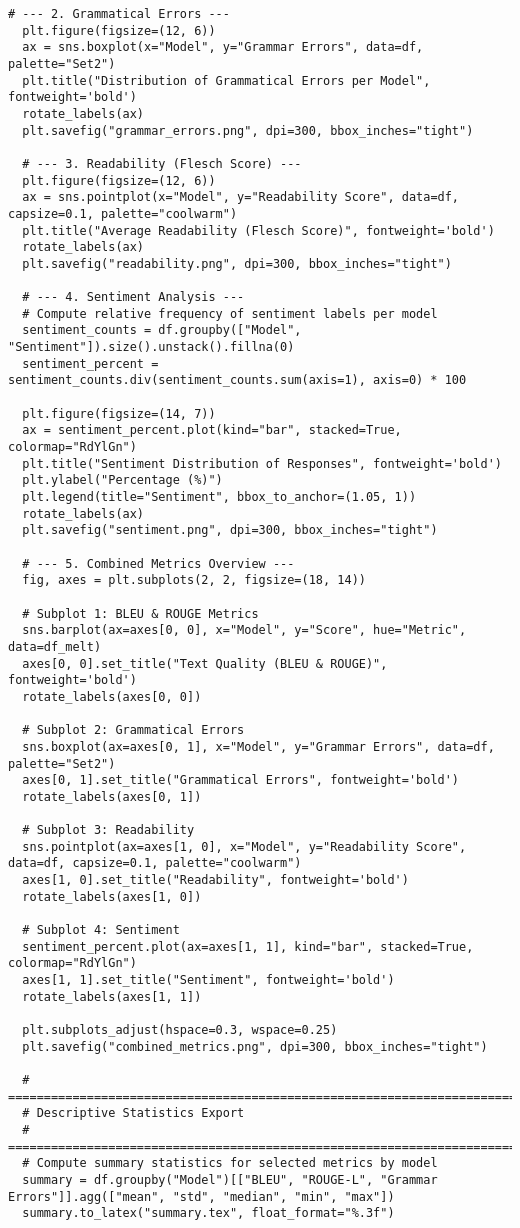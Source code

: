 \begin{lstlisting}[style=Python, caption={Python-qualitative-data-analysis}, captionpos=b]
  # --- 2. Grammatical Errors ---
  plt.figure(figsize=(12, 6))
  ax = sns.boxplot(x="Model", y="Grammar Errors", data=df, palette="Set2")
  plt.title("Distribution of Grammatical Errors per Model", fontweight='bold')
  rotate_labels(ax)
  plt.savefig("grammar_errors.png", dpi=300, bbox_inches="tight")
  
  # --- 3. Readability (Flesch Score) ---
  plt.figure(figsize=(12, 6))
  ax = sns.pointplot(x="Model", y="Readability Score", data=df, capsize=0.1, palette="coolwarm")
  plt.title("Average Readability (Flesch Score)", fontweight='bold')
  rotate_labels(ax)
  plt.savefig("readability.png", dpi=300, bbox_inches="tight")
  
  # --- 4. Sentiment Analysis ---
  # Compute relative frequency of sentiment labels per model
  sentiment_counts = df.groupby(["Model", "Sentiment"]).size().unstack().fillna(0)
  sentiment_percent = sentiment_counts.div(sentiment_counts.sum(axis=1), axis=0) * 100
  
  plt.figure(figsize=(14, 7))
  ax = sentiment_percent.plot(kind="bar", stacked=True, colormap="RdYlGn")
  plt.title("Sentiment Distribution of Responses", fontweight='bold')
  plt.ylabel("Percentage (%)")
  plt.legend(title="Sentiment", bbox_to_anchor=(1.05, 1))
  rotate_labels(ax)
  plt.savefig("sentiment.png", dpi=300, bbox_inches="tight")
  
  # --- 5. Combined Metrics Overview ---
  fig, axes = plt.subplots(2, 2, figsize=(18, 14))
  
  # Subplot 1: BLEU & ROUGE Metrics
  sns.barplot(ax=axes[0, 0], x="Model", y="Score", hue="Metric", data=df_melt)
  axes[0, 0].set_title("Text Quality (BLEU & ROUGE)", fontweight='bold')
  rotate_labels(axes[0, 0])
  
  # Subplot 2: Grammatical Errors
  sns.boxplot(ax=axes[0, 1], x="Model", y="Grammar Errors", data=df, palette="Set2")
  axes[0, 1].set_title("Grammatical Errors", fontweight='bold')
  rotate_labels(axes[0, 1])
  
  # Subplot 3: Readability
  sns.pointplot(ax=axes[1, 0], x="Model", y="Readability Score", data=df, capsize=0.1, palette="coolwarm")
  axes[1, 0].set_title("Readability", fontweight='bold')
  rotate_labels(axes[1, 0])
  
  # Subplot 4: Sentiment
  sentiment_percent.plot(ax=axes[1, 1], kind="bar", stacked=True, colormap="RdYlGn")
  axes[1, 1].set_title("Sentiment", fontweight='bold')
  rotate_labels(axes[1, 1])
  
  plt.subplots_adjust(hspace=0.3, wspace=0.25)
  plt.savefig("combined_metrics.png", dpi=300, bbox_inches="tight")
  
  # =============================================================================
  # Descriptive Statistics Export
  # =============================================================================
  # Compute summary statistics for selected metrics by model
  summary = df.groupby("Model")[["BLEU", "ROUGE-L", "Grammar Errors"]].agg(["mean", "std", "median", "min", "max"])
  summary.to_latex("summary.tex", float_format="%.3f")  
\end{lstlisting}

